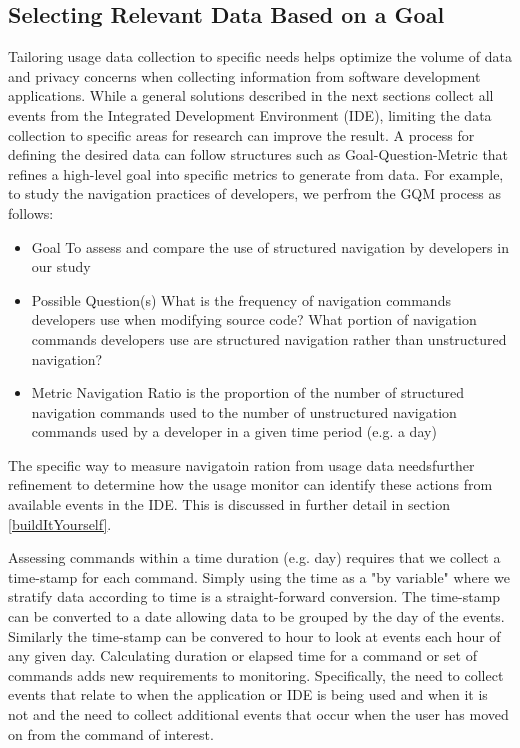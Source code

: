 \subsection{Selecting Relevant Data Based on a Goal}
	Tailoring usage data collection to specific needs helps optimize the volume of data and privacy concerns when collecting information from software development applications.  While a general solutions described in the next sections collect all events from the Integrated Development Environment (IDE), limiting the data collection to specific areas for research can improve the result.  A process for defining the desired data can follow structures such as Goal-Question-Metric \cite{basili-GQM}  that refines a high-level goal into specific metrics to generate from data.  For example, to study the navigation practices of developers, we perfrom the GQM process as follows:
    \begin{itemize}
\item
	Goal
\subitem
	To assess and compare the use of structured navigation by developers in our study
\item
	Possible Question(s)
\subitem
	What is the frequency  of navigation commands developers use when modifying source code?
\subitem
	What portion of navigation commands developers use are structured navigation rather than unstructured navigation?
\item
	Metric
\subitem
	Navigation Ratio is the proportion of the number of structured navigation commands used to the number of unstructured navigation commands used by a developer in a given time period (e.g. a day)

	    \end{itemize}

The specific way to measure navigatoin ration from usage data needsfurther refinement to determine how the usage monitor can identify these actions from available events in the IDE. This is discussed in further detail in section \ref{buildItYourself}.

Assessing commands within a time duration (e.g. day) requires that we collect a time-stamp for each command.  Simply using the time as a "by variable" where we stratify data according to time is a straight-forward conversion.  The time-stamp can be converted to a date allowing data to be grouped by the day of the events.  Similarly the time-stamp can be convered to hour to look at events each hour of any given day.
Calculating duration or elapsed time for a command or set of commands adds new requirements to monitoring.  Specifically, the need to collect events that relate to when the application or IDE is being used and when it is not and the need to collect additional events that occur when the user has moved on from the command of interest.  


